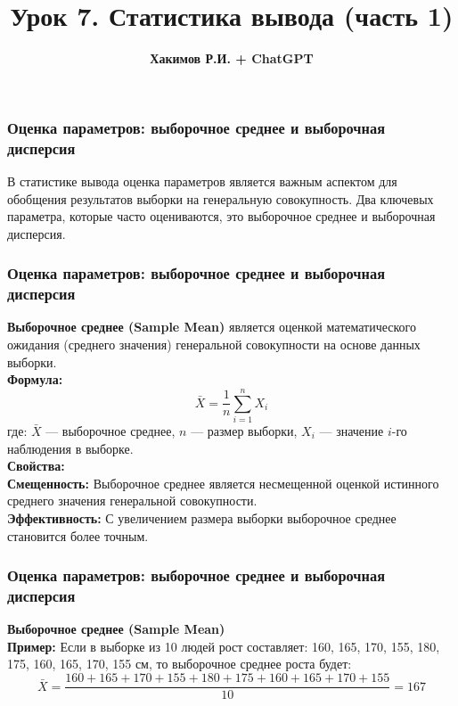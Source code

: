 \documentclass[aspectratio=169]{beamer}
\title{\bf Урок 7. Статистика вывода (часть 1)}
\author{{\bf Хакимов Р.И. + ChatGPT}}
\date[\today]{}
\begin{document}
\begin{frame}
\titlepage
\end{frame}

\begin{frame}
\frametitle{Оценка параметров: выборочное среднее и выборочная дисперсия}
В статистике вывода оценка параметров является важным аспектом для обобщения результатов выборки на генеральную совокупность. Два ключевых параметра, которые часто оцениваются, это выборочное среднее и выборочная дисперсия.
\end{frame}

\begin{frame}
\frametitle{Оценка параметров: выборочное среднее и выборочная дисперсия}
{\bf Выборочное среднее (Sample Mean)} является оценкой математического ожидания (среднего значения) генеральной совокупности на основе данных выборки.\\
{\bf Формула:}
  \[
  \bar{X} = \frac{1}{n} \sum_{i=1}^{n} X_i
  \]
где: \( \bar{X} \) — выборочное среднее, \( n \) — размер выборки, \( X_i \) — значение \( i \)-го наблюдения в выборке.\\
{\bf Свойства:}\\
{\bf Смещенность:} Выборочное среднее является несмещенной оценкой истинного среднего значения генеральной совокупности.\\
{\bf Эффективность:} С увеличением размера выборки выборочное среднее становится более точным.
\end{frame}

\begin{frame}
\frametitle{Оценка параметров: выборочное среднее и выборочная дисперсия}
{\bf Выборочное среднее (Sample Mean)}\\
{\bf Пример:} Если в выборке из 10 людей рост составляет: 160, 165, 170, 155, 180, 175, 160, 165, 170, 155 см, то выборочное среднее роста будет:
  \[
  \bar{X} = \frac{160 + 165 + 170 + 155 + 180 + 175 + 160 + 165 + 170 + 155}{10} = 167
  \]
\end{frame}
\end{document}

